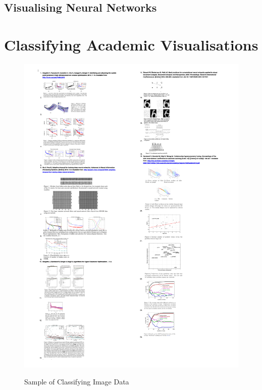 \documentclass[a4paper,11pt,titlepage]{article}
\begin{document}
\subsection{Visualising Neural Networks}


\clearpage




\appendix
	\section{Classifying Academic Visualisations}
		 \begin{figure}[H]
    			\centering	
	{{\includegraphics[width=16cm]
    				{img/explanation_research_02} 
    			}}%
    			\caption{Sample of Classifying Image Data}%
    		\label{fig:studentprofile}
		\end{figure}
\end{document}
